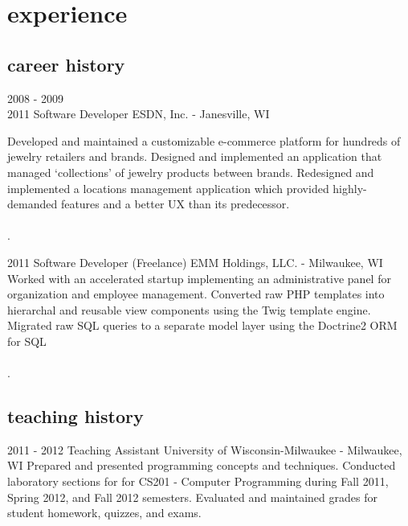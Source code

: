 \documentclass[]{fritz-resume}
\begin{document}

\section{experience}

\subsection{career history}

\begin{entrylist}
	\entry
		{2008 - 2009 \\ 2011}
		{Software Developer}
		{ESDN, Inc. - Janesville, WI}
		{
			Developed and maintained a customizable e-commerce platform for hundreds of jewelry retailers and brands. Designed and implemented an application that managed `collections' of jewelry products between brands. Redesigned and implemented a locations management application which provided highly-demanded features and a better UX than its predecessor. \\\\ .
			
		}
	
	\entry
		{2011}
		{Software Developer (Freelance)}
		{EMM Holdings, LLC. - Milwaukee, WI}
		{
			Worked with an accelerated startup implementing an administrative panel for organization and employee management. Converted raw PHP templates into hierarchal and reusable view components using the Twig template engine. Migrated raw SQL queries to a separate model layer using the Doctrine2 ORM for SQL\\\\ .
		}
\end{entrylist}

\subsection{teaching history}

\begin{entrylist}
	\entry
		{2011 - 2012}
		{Teaching Assistant}
		{University of Wisconsin-Milwaukee - Milwaukee, WI}
		{
			Prepared and presented programming concepts and techniques. Conducted laboratory sections for for CS201 - Computer Programming during Fall 2011, Spring 2012, and Fall 2012 semesters. Evaluated and maintained grades for student homework, quizzes, and exams.
		}
\end{entrylist}
\end{document}
